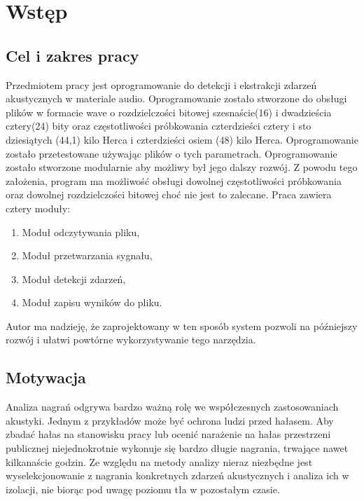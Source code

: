 \documentclass[12pt,a4paper]{article}
\author{Konrad Janowski}
\begin{document}
\tableofcontents
\newpage
\section{Wstęp}
\subsection{Cel i zakres pracy}
Przedmiotem pracy jest oprogramowanie do detekcji i ekstrakcji zdarzeń akustycznych w materiale audio. Oprogramowanie zostało stworzone do obsługi plików w formacie wave o rozdzielczości bitowej szesnaście(16) i dwadzieścia cztery(24) bity oraz częstotliwości próbkowania czterdzieści cztery i sto dziesiątych (44,1) kilo Herca i  czterdzieści osiem (48) kilo Herca. Oprogramowanie zostało przetestowane używając plików o tych parametrach. Oprogramowanie zostało stworzone modularnie aby możliwy był jego dalszy rozwój. Z powodu tego założenia, program ma możliwość obsługi dowolnej częstotliwości próbkowania oraz dowolnej rozdzielczości bitowej choć nie jest to zalecane. Praca zawiera cztery moduły:
\begin{enumerate}
\item Moduł odczytywania pliku,
\item Moduł przetwarzania sygnału,
\item Moduł detekcji zdarzeń,
\item Moduł zapisu wyników do pliku.
\end{enumerate}
Autor ma nadzieję, że zaprojektowany w ten sposób system pozwoli na późniejszy rozwój i ułatwi powtórne wykorzystywanie tego narzędzia.
\subsection{Motywacja}
Analiza nagrań odgrywa bardzo ważną rolę we współczesnych zastosowaniach akustyki. Jednym z przykładów może być ochrona ludzi przed hałasem. Aby zbadać hałas na stanowisku pracy lub ocenić narażenie na hałas przestrzeni publicznej niejednokrotnie wykonuje się bardzo długie nagrania, trwające nawet kilkanaście godzin. Ze względu na metody analizy nieraz niezbędne jest wyselekcjonowanie z nagrania konkretnych zdarzeń akustycznych i analiza ich w izolacji, nie biorąc pod uwagę poziomu tła w pozostałym czasie. 
\end{document}
